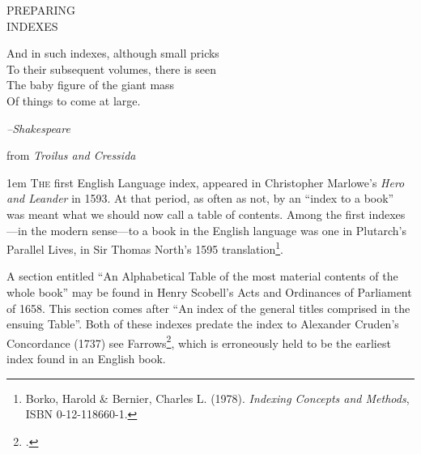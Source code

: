 \thispagestyle{empty}
    \begin{leftcolumn}
       \begin{center} 
          \huge \noindent PREPARING\\
                   INDEXES
       \end{center}
     
      \medskip

       {\justifying \small\noindent And in such indexes, although small pricks\\
To their subsequent volumes, there is seen\\
The baby figure of the giant mass\\
Of things to come at large. \par
\hfill \textit{--Shakespeare}\par
\hfill\hfill{ \RaggedRight from \textit{Troilus and Cressida}}}
\medskip
       \par
   \end{leftcolumn}
   \begin{rightcolumn}
      \begin{multicols}{2}
        
\parindent1em      \lettrine{T}{he} first English Language index, appeared in Christopher Marlowe's \textit{Hero and Leander} in 1593. At that period, as often as not, by an ``index to a book'' was meant what we should now call a table of contents. Among the first indexes---in the modern sense---to a book in the English language was one in Plutarch's Parallel Lives, in Sir Thomas North's 1595 translation\footnote{Borko, Harold \& Bernier, Charles L. (1978). \textit{Indexing Concepts and Methods}, ISBN 0-12-118660-1.}.  

A section entitled \enquote{An Alphabetical Table of the most material contents of the whole book} may be found in Henry Scobell's Acts and Ordinances of Parliament of 1658. This section comes after ``An index of the general titles comprised in the ensuing Table''. Both of these indexes predate the index to Alexander Cruden's Concordance (1737) see Farrows\footcite{farrow96}, which is erroneously held to be the earliest index found in an English book.

      \end{multicols}
   \end{rightcolumn}
\stoptemplate

